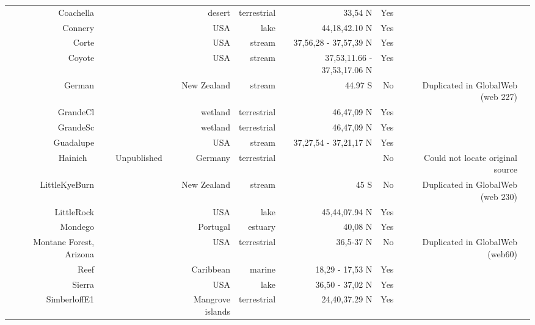 \documentclass[12pt]{article}
\begin{document}
\begin{landscape}
\begin{table}[h!]
\begin{tabular}{rrrrrrrrr}
      Coachella & ~\citet{Riede2011} & ~\citet{Polis1991a} & desert & terrestrial & 33,54 N & Yes   &       &  \\
      Connery & ~\citet{Riede2011} & ~\citet{Havens1992} & USA   & lake  & 44,18,42.10 N & Yes   &       &  \\
      Corte & ~\citet{Riede2011} & ~\citet{Harrison1995} & USA   & stream & 37,56,28 - 37,57,39 N & Yes   &       &  \\
      Coyote & ~\citet{Riede2011} & ~\citet{Harrison1995} & USA   & stream & 37,53,11.66 - 37,53,17.06 N & Yes   &       &  \\
      German & ~\citet{Riede2011} & ~\citet{Townsend1998} & New Zealand & stream & 44.97 S & No    & Duplicated in GlobalWeb (web 227) &  \\
      GrandeCl & ~\citet{Riede2011} & ~\citet{CattinBlandenier2004} & wetland & terrestrial & 46,47,09 N & Yes   &       &  \\
      GrandeSc & ~\citet{Riede2011} & ~\citet{CattinBlandenier2004} & wetland & terrestrial & 46,47,09 N & Yes   &       &  \\
      Guadalupe & ~\citet{Riede2011} & ~\citet{Harrison1995} & USA   & stream & 37,27,54 - 37,21,17 N & Yes   &       &  \\
      Hainich   & ~\citet{Riede2011} & Unpublished & Germany & terrestrial &       & No    & Could not locate original source &  \\
      LittleKyeBurn & ~\citet{Riede2011} & ~\citet{Townsend1998} & New Zealand & stream & 45 S  & No    & Duplicated in GlobalWeb (web 230) &  \\
      LittleRock & ~\citet{Riede2011} & ~\citet{Martinez1991} & USA   & lake  & 45,44,07.94 N & Yes   &       &  \\
      Mondego & ~\citet{Riede2011} & ~\citet{Patricio2006} & Portugal & estuary & 40,08 N & Yes   &       &  \\
      Montane Forest, Arizona & ~\citet{Riede2011} & ~\citet{Rasmussen1941} & USA   & terrestrial & 36,5-37 N & No    & Duplicated in GlobalWeb (web60) &  \\
      Reef  & ~\citet{Riede2011} & ~\citet{Opitz1996} & Caribbean & marine & 18,29 - 17,53 N & Yes   &       &  \\
      Sierra & ~\citet{Riede2011} & ~\citet{Brose2005} & USA   & lake  & 36,50 - 37,02 N & Yes   &       &  \\
      SimberloffE1 & ~\citet{Riede2011} & ~\citet{Simberloff1976} & Mangrove islands & terrestrial & 24,40,37.29 N & Yes   &       &  \\

\end{tabular}
\end{table}
\end{landscape}
\end{document}
